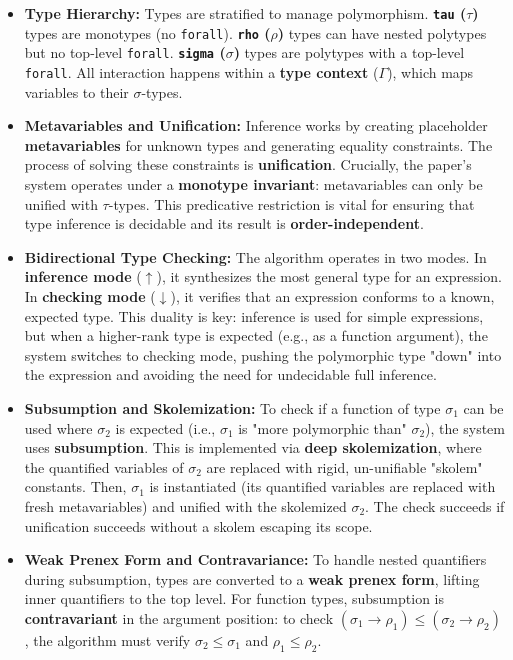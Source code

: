 \begin{itemize}
    \item \textbf{Type Hierarchy:} Types are stratified to manage polymorphism. \textbf{\texttt{tau} ($\tau$)} types are monotypes (no \texttt{forall}). \textbf{\texttt{rho} ($\rho$)} types can have nested polytypes but no top-level \texttt{forall}. \textbf{\texttt{sigma} ($\sigma$)} types are polytypes with a top-level \texttt{forall}. All interaction happens within a \textbf{type context} ($\Gamma$), which maps variables to their $\sigma$-types.

    \item \textbf{Metavariables and Unification:} Inference works by creating placeholder \textbf{metavariables} for unknown types and generating equality constraints. The process of solving these constraints is \textbf{unification}. Crucially, the paper's system operates under a \textbf{monotype invariant}: metavariables can only be unified with $\tau$-types. This predicative restriction is vital for ensuring that type inference is decidable and its result is \textbf{order-independent}.

    \item \textbf{Bidirectional Type Checking:} The algorithm operates in two modes. In \textbf{inference mode} ($\uparrow$), it synthesizes the most general type for an expression. In \textbf{checking mode} ($\downarrow$), it verifies that an expression conforms to a known, expected type. This duality is key: inference is used for simple expressions, but when a higher-rank type is expected (e.g., as a function argument), the system switches to checking mode, pushing the polymorphic type "down" into the expression and avoiding the need for undecidable full inference.

    \item \textbf{Subsumption and Skolemization:} To check if a function of type $\sigma_1$ can be used where $\sigma_2$ is expected (i.e., $\sigma_1$ is "more polymorphic than" $\sigma_2$), the system uses \textbf{subsumption}. This is implemented via \textbf{deep skolemization}, where the quantified variables of $\sigma_2$ are replaced with rigid, un-unifiable "skolem" constants. Then, $\sigma_1$ is instantiated (its quantified variables are replaced with fresh metavariables) and unified with the skolemized $\sigma_2$. The check succeeds if unification succeeds without a skolem escaping its scope.

    \item \textbf{Weak Prenex Form and Contravariance:} To handle nested quantifiers during subsumption, types are converted to a \textbf{weak prenex form}, lifting inner quantifiers to the top level. For function types, subsumption is \textbf{contravariant} in the argument position: to check $(\sigma_1 \to \rho_1) \le (\sigma_2 \to \rho_2)$, the algorithm must verify $\sigma_2 \le \sigma_1$ and $\rho_1 \le \rho_2$.
\end{itemize}

